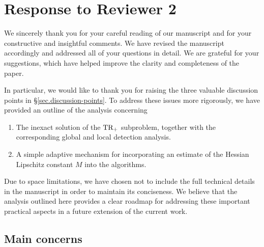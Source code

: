 \section{Response to Reviewer 2}\label{sec.response-to-reviewer2}
{
    \color{blue} We sincerely thank you for your careful reading of our manuscript and for your constructive and insightful comments. We have revised the manuscript accordingly and addressed all of your questions in detail. We are grateful for your suggestions, which have helped improve the clarity and completeness of the paper.

    In particular, we would like to thank you for raising the three valuable discussion points in \S\ref{sec.discussion-points}. To address these issues more rigorously, we have provided an outline of the analysis concerning
    \begin{enumerate}[leftmargin=*]
        \item The inexact solution of the $\textrm{TR}_+$ subproblem, together with the corresponding global and local detection analysis.
        \item A simple adaptive mechanism for incorporating an estimate of the Hessian Lipschitz constant $M$ into the algorithms.
    \end{enumerate}
    Due to space limitations, we have chosen not to include the full technical details in the manuscript in order to maintain its conciseness. We believe that the analysis outlined here provides a clear roadmap for addressing these important practical aspects in a future extension of the current work.
}

\subsection{Main concerns}

